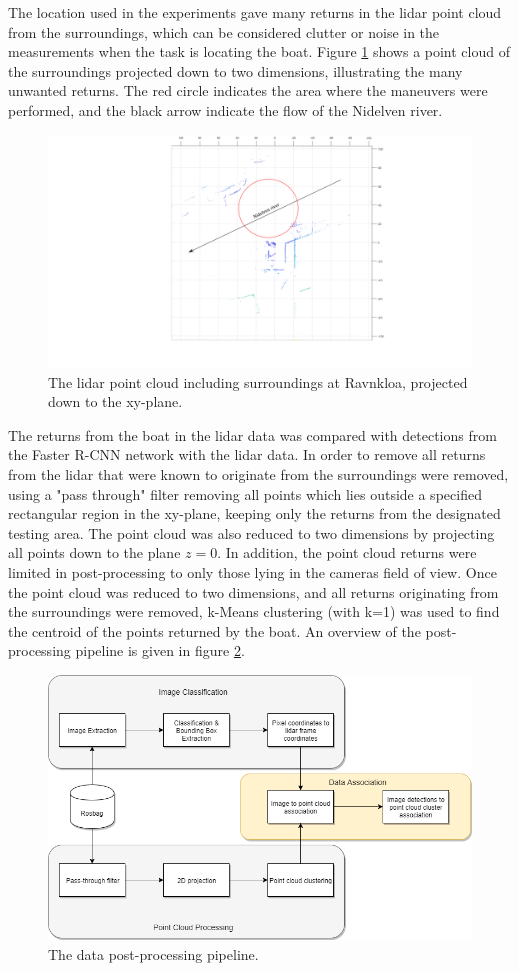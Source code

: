The location used in the experiments gave many returns in the lidar point cloud from the surroundings, which can be considered clutter or noise in the measurements when the task is locating the boat. Figure \ref{fig:ravnkloa_pointcloud} shows a point cloud of the surroundings projected down to two dimensions, illustrating the many unwanted returns. The red circle indicates the area where the maneuvers were performed, and the black arrow indicate the flow of the Nidelven river. 
\begin{figure}[H]
	\centering
	\includegraphics[width=\linewidth]{fig/ravnkloa_surroundings.png}
	\caption{The lidar point cloud including surroundings at Ravnkloa, projected down to the xy-plane.}
	\label{fig:ravnkloa_pointcloud}
\end{figure}
The returns from the boat in the lidar data was compared with detections from the Faster R-CNN network with the lidar data. In order to remove all returns from the lidar that were known to originate from the surroundings were removed, using a "pass through" filter removing all points which lies outside a specified rectangular region in the xy-plane, keeping only the returns from the designated testing area. The point cloud was also reduced to two dimensions by projecting all points down to the plane $z=0$. In addition, the point cloud returns were limited in post-processing to only those lying in the cameras field of view.
Once the point cloud was reduced to two dimensions, and all returns originating from the surroundings were removed, k-Means clustering (with k=1) was used to find the centroid of the points returned by the boat.
An overview of the post-processing pipeline is given in figure \ref{fig:post_pipeline}.
\begin{figure}[H]
	\centering
	\includegraphics[width=.6\linewidth]{fig/post-processing-pipeline.png}
	\caption{The data post-processing pipeline.}
	\label{fig:post_pipeline}
\end{figure}
